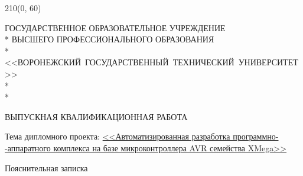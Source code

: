 \begin{center}
\end{center}

\textblockorigin{0mm}{0mm}
\setlength{\TPHorizModule}{1mm}
\setlength{\TPVertModule}{\TPHorizModule}

\begin{textblock}{210}(0, 60)
\end{textblock}

\begin{center}
\MakeUppercase{Государственное образовательное учреждение} \\*
\MakeUppercase{Высшего профессионального образования} \\*	
<<\mbox{\MakeUppercase{Воронежский~государственный~технический~университет}}>>\\*
\underline{} \\*
\begin{flushleft}
\end{flushleft}
\end{center}

\vfill{}

\begin{center}
\MakeUppercase{Выпускная квалификационная работа}
\end{center}

\vfill{}

\begin{flushleft}
Тема дипломного проекта: \underline{<<Автоматизированная разработка программно-}
\underline{-аппаратного комплекса
на базе микроконтроллера AVR семейства XMega>>}
\end{flushleft}

\vfill{}

\begin{center}
Пояснительная записка
\end{center}

